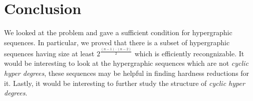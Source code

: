 \section{Conclusion}

We looked at the \hds problem and gave a sufficient condition for hypergraphic sequences.
In particular, we proved that there is a subset of hypergraphic sequences having size at least $2^{\frac{(n-1)\cdot (n-2)}{2}}$ which is efficiently recongnizable.
It would be interesting to look at the hypergraphic sequences which are not {\em cyclic hyper degrees}, these sequences may be helpful in finding hardness reductions for it.
Lastly, it would be interesting to further study the structure of {\em cyclic hyper degrees}.